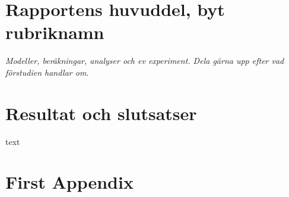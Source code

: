 \documentclass[11pt]{article}
\begin{document}
\begin{flushleft}
\pagebreak

\section{Rapportens huvuddel, byt rubriknamn}
\textit{Modeller, beräkningar, analyser och ev experiment. Dela gärna upp efter vad förstudien handlar om.}

\pagebreak

\section{Resultat och slutsatser}
text

\pagebreak
{}



\pagebreak
\appendix
\section{First Appendix}

\end{flushleft}
\end{document}
